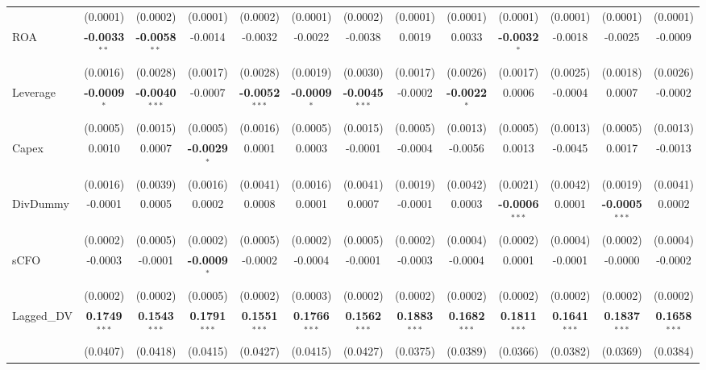 \documentclass[11pt,a4paper]{article}
\begin{document}
\begin{table}[htbp]
\begin{tabular}{lcccccccccccc}
 & (0.0001) & (0.0002) & (0.0001) & (0.0002) & (0.0001) & (0.0002) & (0.0001) & (0.0001) & (0.0001) & (0.0001) & (0.0001) & (0.0001) \\
ROA & \textbf{-0.0033}$^{**}$ & \textbf{-0.0058}$^{**}$ & -0.0014 & -0.0032 & -0.0022 & -0.0038 & 0.0019 & 0.0033 & \textbf{-0.0032}$^{*}$ & -0.0018 & -0.0025 & -0.0009 \\
 & (0.0016) & (0.0028) & (0.0017) & (0.0028) & (0.0019) & (0.0030) & (0.0017) & (0.0026) & (0.0017) & (0.0025) & (0.0018) & (0.0026) \\
Leverage & \textbf{-0.0009}$^{*}$ & \textbf{-0.0040}$^{***}$ & -0.0007 & \textbf{-0.0052}$^{***}$ & \textbf{-0.0009}$^{*}$ & \textbf{-0.0045}$^{***}$ & -0.0002 & \textbf{-0.0022}$^{*}$ & 0.0006 & -0.0004 & 0.0007 & -0.0002 \\
 & (0.0005) & (0.0015) & (0.0005) & (0.0016) & (0.0005) & (0.0015) & (0.0005) & (0.0013) & (0.0005) & (0.0013) & (0.0005) & (0.0013) \\
Capex & 0.0010 & 0.0007 & \textbf{-0.0029}$^{*}$ & 0.0001 & 0.0003 & -0.0001 & -0.0004 & -0.0056 & 0.0013 & -0.0045 & 0.0017 & -0.0013 \\
 & (0.0016) & (0.0039) & (0.0016) & (0.0041) & (0.0016) & (0.0041) & (0.0019) & (0.0042) & (0.0021) & (0.0042) & (0.0019) & (0.0041) \\
DivDummy & -0.0001 & 0.0005 & 0.0002 & 0.0008 & 0.0001 & 0.0007 & -0.0001 & 0.0003 & \textbf{-0.0006}$^{***}$ & 0.0001 & \textbf{-0.0005}$^{***}$ & 0.0002 \\
 & (0.0002) & (0.0005) & (0.0002) & (0.0005) & (0.0002) & (0.0005) & (0.0002) & (0.0004) & (0.0002) & (0.0004) & (0.0002) & (0.0004) \\
sCFO & -0.0003 & -0.0001 & \textbf{-0.0009}$^{*}$ & -0.0002 & -0.0004 & -0.0001 & -0.0003 & -0.0004 & 0.0001 & -0.0001 & -0.0000 & -0.0002 \\
 & (0.0002) & (0.0002) & (0.0005) & (0.0002) & (0.0003) & (0.0002) & (0.0002) & (0.0002) & (0.0002) & (0.0002) & (0.0002) & (0.0002) \\
Lagged\_DV & \textbf{0.1749}$^{***}$ & \textbf{0.1543}$^{***}$ & \textbf{0.1791}$^{***}$ & \textbf{0.1551}$^{***}$ & \textbf{0.1766}$^{***}$ & \textbf{0.1562}$^{***}$ & \textbf{0.1883}$^{***}$ & \textbf{0.1682}$^{***}$ & \textbf{0.1811}$^{***}$ & \textbf{0.1641}$^{***}$ & \textbf{0.1837}$^{***}$ & \textbf{0.1658}$^{***}$ \\
 & (0.0407) & (0.0418) & (0.0415) & (0.0427) & (0.0415) & (0.0427) & (0.0375) & (0.0389) & (0.0366) & (0.0382) & (0.0369) & (0.0384) \\

\end{tabular}
\end{table}
\end{document}

